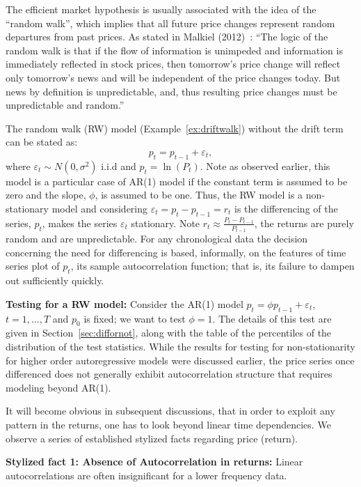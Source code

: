 The efficient market hypothesis is usually associated with the idea of the ``random walk'', which implies that all future price changes represent random departures from past prices. As stated in Malkiel (2012)~\cite{malkiel}: ``The logic of the random walk is that if the flow of information is unimpeded and information is immediately reflected in stock prices, then tomorrow's price change will reflect only tomorrow's news and will be independent of the price changes today. But news by definition is unpredictable, and, thus resulting price changes must be unpredictable and random.''


The random walk (RW) model (Example~\ref{ex:driftwalk}) without the drift term can be stated as:
	\begin{equation} \label{eqn:2pteq}
	p_t = p_{t-1} + \varepsilon_t,
	\end{equation}
where $\varepsilon_t \sim N(0,\sigma^2)$ i.i.d and $p_t = \ln{(P_t)}$. Note as observed earlier, this model is a particular case of AR(1) model if the constant term is assumed to be zero and the slope, $\phi$, is assumed to be one. Thus, the RW model is a non-stationary model and considering $\varepsilon_t = p_t - p_{t-1}=r_t$ is the differencing of the series, $p_t$, makes the series $\varepsilon_t$ stationary. Note $r_t \approx \frac{P_t - P_{t-1}}{P_{t-1}}$,  the returns are purely random and are unpredictable. For any chronological data the decision concerning the need for differencing is based, informally, on the features of time series plot of $p_t$, its sample autocorrelation function; that is, its failure to dampen out sufficiently quickly. \twomedskip


\noindent\textbf{Testing for a RW model:} Consider the AR(1) model $p_t = \phi p_{t-1} + \varepsilon_t$, $t = 1,\ldots,T$ and $p_0$ is fixed; we want to test $\phi = 1$. The details of this test are given in Section~\ref{sec:diffornot}, along with the table of the percentiles of the distribution of the test statistics. While the results for testing for non-stationarity for higher order autoregressive models were discussed earlier, the price series once differenced does not generally exhibit autocorrelation structure that requires modeling beyond AR(1).


It will become obvious in subsequent discussions, that in order to exploit any pattern in the returns, one has to look beyond linear time dependencies. We observe a series of established stylized facts regarding price (return). \twomedskip


\noindent\textbf{Stylized fact 1: Absence of Autocorrelation in returns:} Linear autocorrelations are often insignificant for a lower frequency data. 


